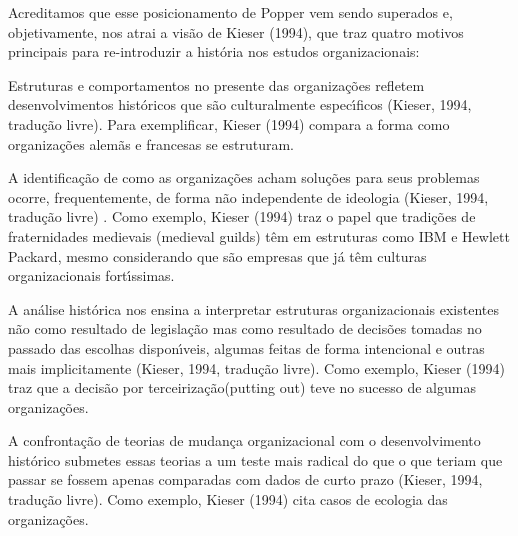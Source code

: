 \documentclass[
12pt,		%
openright,	%
twoside,  %
a4paper,			%
chapter=TITLE,		%
english,			%
french,				%
spanish,			%
brazil				%
]{USPSC-classe/USPSC}
\begin{document}
Acreditamos que esse posicionamento de Popper vem sendo superados e, objetivamente, nos atrai a vis\~ao de  Kieser (1994), que traz quatro motivos principais para re-introduzir a hist\'oria nos estudos organizacionais:


















\begin{alineas}
\item Estruturas e comportamentos no presente das organiza\c{c}\~oes refletem desenvolvimentos hist\'oricos que s\~ao culturalmente espec\'{\i}ficos  (Kieser, 1994, tradu\c{c}\~ao livre). Para exemplificar,  Kieser (1994) compara a forma como organiza\c{c}\~oes alem\~as e francesas se estruturam.
\item A identifica\c{c}\~ao de como as organiza\c{c}\~oes acham solu\c{c}\~oes para seus problemas ocorre, frequentemente, de forma n\~ao independente de ideologia  (Kieser, 1994, tradu\c{c}\~ao livre) . Como exemplo,  Kieser (1994) traz o papel  que tradi\c{c}\~oes de fraternidades medievais (medieval guilds) t\^em em estruturas como IBM e Hewlett Packard, mesmo considerando que s\~ao empresas que j\'a t\^em culturas organizacionais fort\'{\i}ssimas.
\item A an\'alise hist\'orica nos ensina a interpretar estruturas organizacionais existentes n\~ao como resultado de legisla\c{c}\~ao mas como resultado de decis\~oes tomadas no passado das escolhas dispon\'{\i}veis, algumas feitas de forma intencional e outras mais implicitamente  (Kieser, 1994, tradu\c{c}\~ao livre). Como exemplo,  Kieser (1994) traz que a decis\~ao por \textquotedbl terceiriza\c{c}\~ao\textquotedbl  (putting out) teve no sucesso de algumas organiza\c{c}\~oes.
\item A confronta\c{c}\~ao de teorias de mudan\c{c}a organizacional com o desenvolvimento hist\'orico submetes essas teorias a um teste mais radical do que o que teriam que passar se fossem apenas comparadas com dados de curto prazo (Kieser, 1994, tradu\c{c}\~ao livre). Como exemplo,  Kieser (1994) cita casos de ecologia das organiza\c{c}\~oes.
\end{alineas}
\end{document}
